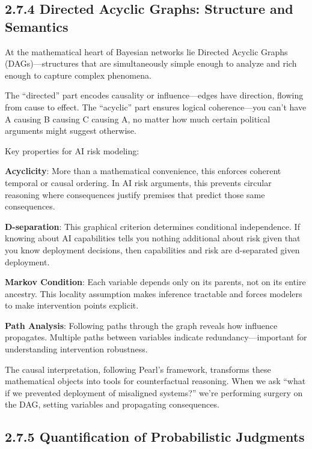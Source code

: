 \documentclass[
  11pt,
  letterpaper,
  openany]{book}
\begin{document}
\subsection{2.7.4 Directed Acyclic Graphs: Structure and
Semantics}\label{sec-dag-structure}

At the mathematical heart of Bayesian networks lie Directed Acyclic
Graphs (DAGs)---structures that are simultaneously simple enough to
analyze and rich enough to capture complex phenomena.

The ``directed'' part encodes causality or influence---edges have
direction, flowing from cause to effect. The ``acyclic'' part ensures
logical coherence---you can't have A causing B causing C causing A, no
matter how much certain political arguments might suggest otherwise.

Key properties for AI risk modeling:

\textbf{Acyclicity}: More than a mathematical convenience, this enforces
coherent temporal or causal ordering. In AI risk arguments, this
prevents circular reasoning where consequences justify premises that
predict those same consequences.

\textbf{D-separation}: This graphical criterion determines conditional
independence. If knowing about AI capabilities tells you nothing
additional about risk given that you know deployment decisions, then
capabilities and risk are d-separated given deployment.

\textbf{Markov Condition}: Each variable depends only on its parents,
not on its entire ancestry. This locality assumption makes inference
tractable and forces modelers to make intervention points explicit.

\textbf{Path Analysis}: Following paths through the graph reveals how
influence propagates. Multiple paths between variables indicate
redundancy---important for understanding intervention robustness.

The causal interpretation, following Pearl's framework, transforms these
mathematical objects into tools for counterfactual reasoning. When we
ask ``what if we prevented deployment of misaligned systems?'' we're
performing surgery on the DAG, setting variables and propagating
consequences.

\subsection{2.7.5 Quantification of Probabilistic
Judgments}\label{sec-quantification}
\end{document}
